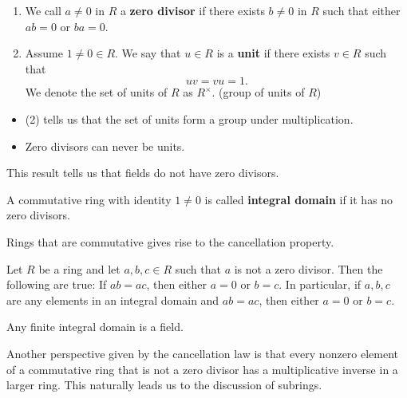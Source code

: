 \begin{definition}
    \begin{enumerate}
        \item[(1)] We call \( a \neq 0  \) in \( R  \) a \textbf{zero divisor} if there exists \( b \neq 0  \) in \( R  \) such that either \( ab = 0  \) or \( ba = 0  \).
        \item[(2)] Assume \( 1 \neq 0 \in R   \). We say that \( u \in R  \) is a \textbf{unit} if there exists \( v \in R  \) such that 
            \[  uv = vu = 1.  \]
        We denote the set of units of \( R  \) as \( R^{\times} \). (group of units of \( R  \))
    \end{enumerate}
\end{definition}

\begin{itemize}
    \item (2) tells us that the set of units form a group under multiplication.
    \item Zero divisors can never be units.
\end{itemize}

This result tells us that fields do not have zero divisors.

\begin{definition}
    A commutative ring with identity \( 1 \neq 0  \) is called \textbf{integral domain} if it has no zero divisors.
\end{definition}

Rings that are commutative gives rise to the cancellation property.

\begin{prop}
    Let \( R  \) be a ring and let \( a,b,c \in R  \) such that \( a  \) is not a zero divisor. Then the following are true: 
    If \( a b = ac  \), then either \( a = 0  \) or \( b = c  \). In particular, if \( a,b,c  \) are any elements in an integral domain and \( ab = ac  \), then either \( a = 0  \) or \( b = c  \).
\end{prop}

\begin{corollary}
    Any finite integral domain is a field.
\end{corollary}

Another perspective given by the cancellation law is that every nonzero element of a commutative ring that is not a zero divisor has a multiplicative inverse in a larger ring. This naturally leads us to the discussion of subrings.

